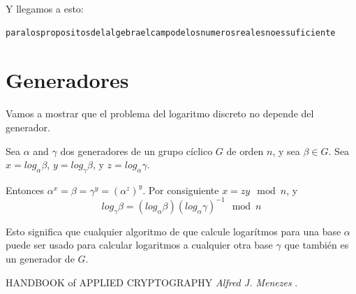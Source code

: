 \documentclass[12pt, fleqn]{report}                             %
\theoremstyle{break}                                            %
\begin{document}
      Y llegamos a esto:
      \begin{lstlisting}[language=Python, gobble=8]
        paralospropositosdelalgebraelcampodelosnumerosrealesnoessuficiente
      \end{lstlisting}



\chapter{Generadores}

      Vamos a mostrar que el problema del logaritmo discreto no depende del generador.
      
      Sea $\alpha$ and $\gamma$ dos generadores de un grupo cíclico $G$ de orden $n$, y
      sea $\beta \in G$. 
      Sea $x = log_\alpha \beta$, $y = log_\gamma \beta$, y $z = log_\alpha \gamma$.

      Entonces $\alpha^x = \beta = \gamma^y = (\alpha^z)^y$.
      Por consiguiente $x = zy \mod{n}$, y 
      \begin{equation*}
        log_\gamma \beta = (log_\alpha \beta)(log_\alpha \gamma)^{-1} \mod{n}
      \end{equation*}

      Esto significa que cualquier algoritmo de que calcule logarítmos para una base 
      $\alpha$ puede ser usado para calcular logaritmos a cualquier otra base 
      $\gamma$ que también es un generador de $G$.

  \begin{thebibliography}{10}

        HANDBOOK of APPLIED CRYPTOGRAPHY 
        \textit{Alfred J. Menezes }. 

  \end{thebibliography}
\end{document}

